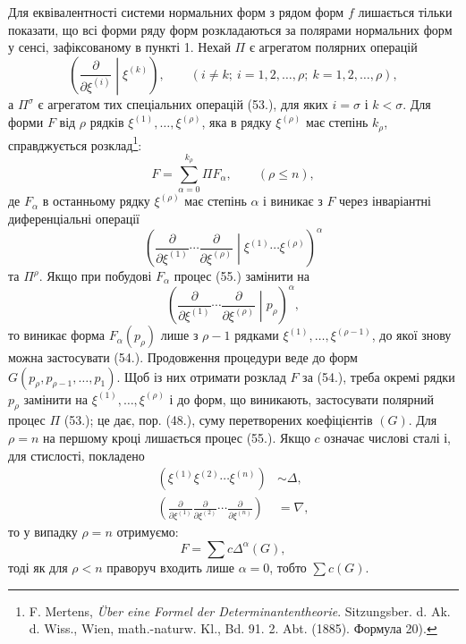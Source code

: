 \documentclass[11pt]{article}
\begin{document}
Для еквівалентності системи нормальних форм з рядом форм $f$ лишається тільки показати, що всі форми ряду форм розкладаються за полярами нормальних форм у сенсі, зафіксованому в пункті 1. Нехай $\Pi$ є агрегатом полярних операцій
\begin{equation}
 \left(\frac{\partial}{\partial\xi^{(i)}}\middle|\xi^{(k)}\right),
 \qquad (i\ne k;\ i=1,2,\ldots,\rho;\ k=1,2,\ldots,\rho),
\tag{53}
\end{equation}
а $\Pi^\sigma$ є агрегатом тих спеціальних операцій (53.), для яких $i=\sigma$ і $k<\sigma$. Для форми $F$ від $\rho$ рядків $\xi^{(1)},\ldots,\xi^{(\rho)}$, яка в рядку $\xi^{(\rho)}$ має степінь $k_\rho$, справджується розклад\footnote{F. Mertens, \emph{\"Uber eine Formel der Determinantentheorie}. Sitzungsber. d. Ak. d. Wiss., Wien, math.-naturw. Kl., Bd. 91. 2. Abt. (1885). Формула 20).}:
\begin{equation}
 F=\sum_{\alpha=0}^{k_\rho}\Pi F_\alpha,
 \qquad(\rho\le n),
\tag{54}
\end{equation}
де $F_\alpha$ в останньому рядку $\xi^{(\rho)}$ має степінь $\alpha$ і виникає з $F$ через інваріантні диференціальні операції
\begin{equation}
 \left(\frac{\partial}{\partial\xi^{(1)}}\cdots\frac{\partial}{\partial\xi^{(\rho)}}\middle|\xi^{(1)}\cdots\xi^{(\rho)}\right)^\alpha
\tag{55}
\end{equation}
та $\Pi^\rho$. Якщо при побудові $F_\alpha$ процес (55.) замінити на
\begin{equation}
 \left(\frac{\partial}{\partial\xi^{(1)}}\cdots\frac{\partial}{\partial\xi^{(\rho)}}\middle|p_\rho\right)^\alpha,
\tag{56}
\end{equation}
то виникає форма $F_\alpha(p_\rho)$ лише з $\rho-1$ рядками $\xi^{(1)},\ldots,\xi^{(\rho-1)}$, до якої знову можна застосувати (54.). Продовження процедури веде до форм $G(p_\rho,p_{\rho-1},\ldots,p_1)$. Щоб із них отримати розклад $F$ за (54.), треба окремі рядки $p_\rho$ замінити на $\xi^{(1)},\ldots,\xi^{(\rho)}$ і до форм, що виникають, застосувати полярний процес $\Pi$ (53.); це дає, пор. (48.), суму перетворених коефіцієнтів $(G)$. Для $\rho=n$ на першому кроці лишається процес (55.). Якщо $c$ означає числові сталі і, для стислості, покладено
\begin{equation}
\begin{aligned}
(\xi^{(1)}\xi^{(2)}\cdots\xi^{(n)})&\sim\Delta,\\
\left(\frac{\partial}{\partial\xi^{(1)}}\frac{\partial}{\partial\xi^{(2)}}\cdots\frac{\partial}{\partial\xi^{(n)}}\right)&=\nabla,
\end{aligned}
\tag{57}
\end{equation}
то у випадку $\rho=n$ отримуємо:
\begin{equation}
 F=\sum c\Delta^\alpha(G),
\tag{58}
\end{equation}
тоді як для $\rho<n$ праворуч входить лише $\alpha=0$, тобто $\sum c(G)$.
\end{document}
